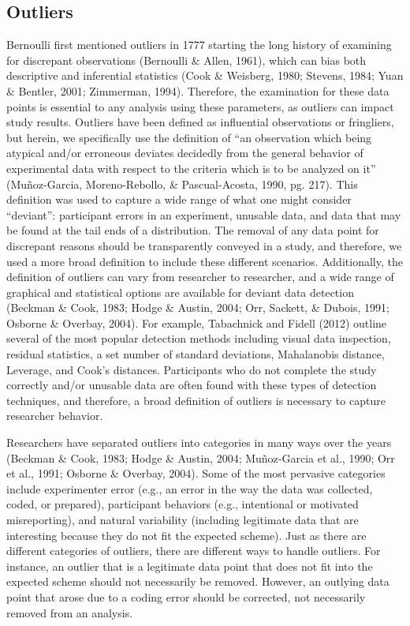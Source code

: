 \documentclass[english,,man,mask]{apa6}
\theoremstyle{definition}
\theoremstyle{definition}
\theoremstyle{definition}
\theoremstyle{remark}
\begin{document}
\subsection{Outliers}\label{outliers}

Bernoulli first mentioned outliers in 1777 starting the long history of
examining for discrepant observations (Bernoulli \& Allen, 1961), which
can bias both descriptive and inferential statistics (Cook \& Weisberg,
1980; Stevens, 1984; Yuan \& Bentler, 2001; Zimmerman, 1994). Therefore,
the examination for these data points is essential to any analysis using
these parameters, as outliers can impact study results. Outliers have
been defined as influential observations or fringliers, but herein, we
specifically use the definition of \enquote{an observation which being
atypical and/or erroneous deviates decidedly from the general behavior
of experimental data with respect to the criteria which is to be
analyzed on it} (Muñoz-Garcia, Moreno-Rebollo, \& Pascual-Acosta, 1990,
pg. 217). This definition was used to capture a wide range of what one
might consider \enquote{deviant}: participant errors in an experiment,
unusable data, and data that may be found at the tail ends of a
distribution. The removal of any data point for discrepant reasons
should be transparently conveyed in a study, and therefore, we used a
more broad definition to include these different scenarios.
Additionally, the definition of outliers can vary from researcher to
researcher, and a wide range of graphical and statistical options are
available for deviant data detection (Beckman \& Cook, 1983; Hodge \&
Austin, 2004; Orr, Sackett, \& Dubois, 1991; Osborne \& Overbay, 2004).
For example, Tabachnick and Fidell (2012) outline several of the most
popular detection methods including visual data inspection, residual
statistics, a set number of standard deviations, Mahalanobis distance,
Leverage, and Cook's distances. Participants who do not complete the
study correctly and/or unusable data are often found with these types of
detection techniques, and therefore, a broad definition of outliers is
necessary to capture researcher behavior.

Researchers have separated outliers into categories in many ways over
the years (Beckman \& Cook, 1983; Hodge \& Austin, 2004; Muñoz-Garcia et
al., 1990; Orr et al., 1991; Osborne \& Overbay, 2004). Some of the most
pervasive categories include experimenter error (e.g., an error in the
way the data was collected, coded, or prepared), participant behaviors
(e.g., intentional or motivated misreporting), and natural variability
(including legitimate data that are interesting because they do not fit
the expected scheme). Just as there are different categories of
outliers, there are different ways to handle outliers. For instance, an
outlier that is a legitimate data point that does not fit into the
expected scheme should not necessarily be removed. However, an outlying
data point that arose due to a coding error should be corrected, not
necessarily removed from an analysis.
\end{document}
